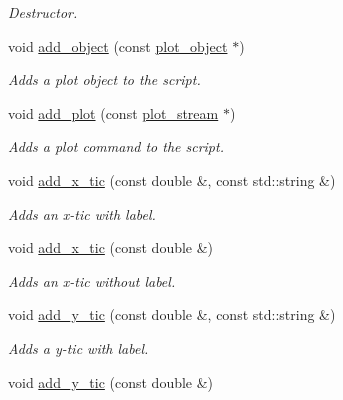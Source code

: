 \begin{DoxyCompactItemize}
\begin{DoxyCompactList}\small\item\em Destructor. \end{DoxyCompactList}\item 
\hypertarget{a00431_a9a10103f30cfc5d8db6498c5c436d515}{}void \hyperlink{a00431_a9a10103f30cfc5d8db6498c5c436d515}{add\+\_\+object} (const \hyperlink{a00429}{plot\+\_\+object} $\ast$)\label{a00431_a9a10103f30cfc5d8db6498c5c436d515}

\begin{DoxyCompactList}\small\item\em Adds a plot object to the script. \end{DoxyCompactList}\item 
\hypertarget{a00431_a399204944beeb0369c9a9e8e4c834468}{}void \hyperlink{a00431_a399204944beeb0369c9a9e8e4c834468}{add\+\_\+plot} (const \hyperlink{a00432}{plot\+\_\+stream} $\ast$)\label{a00431_a399204944beeb0369c9a9e8e4c834468}

\begin{DoxyCompactList}\small\item\em Adds a plot command to the script. \end{DoxyCompactList}\item 
\hypertarget{a00431_a6650a6549d91062dc051cf58e1bcc6f6}{}void \hyperlink{a00431_a6650a6549d91062dc051cf58e1bcc6f6}{add\+\_\+x\+\_\+tic} (const double \&, const std\+::string \&)\label{a00431_a6650a6549d91062dc051cf58e1bcc6f6}

\begin{DoxyCompactList}\small\item\em Adds an x-\/tic with label. \end{DoxyCompactList}\item 
\hypertarget{a00431_ac66b6ca9c55ce3c7bb5564d85de164f1}{}void \hyperlink{a00431_ac66b6ca9c55ce3c7bb5564d85de164f1}{add\+\_\+x\+\_\+tic} (const double \&)\label{a00431_ac66b6ca9c55ce3c7bb5564d85de164f1}

\begin{DoxyCompactList}\small\item\em Adds an x-\/tic without label. \end{DoxyCompactList}\item 
\hypertarget{a00431_ac4aad4ee5ca9db17b6fbd0f2abe19b53}{}void \hyperlink{a00431_ac4aad4ee5ca9db17b6fbd0f2abe19b53}{add\+\_\+y\+\_\+tic} (const double \&, const std\+::string \&)\label{a00431_ac4aad4ee5ca9db17b6fbd0f2abe19b53}

\begin{DoxyCompactList}\small\item\em Adds a y-\/tic with label. \end{DoxyCompactList}\item 
\hypertarget{a00431_a0e3fdc13401799092c51d813ea174fa3}{}void \hyperlink{a00431_a0e3fdc13401799092c51d813ea174fa3}{add\+\_\+y\+\_\+tic} (const double \&)\label{a00431_a0e3fdc13401799092c51d813ea174fa3}


\end{DoxyCompactItemize}
